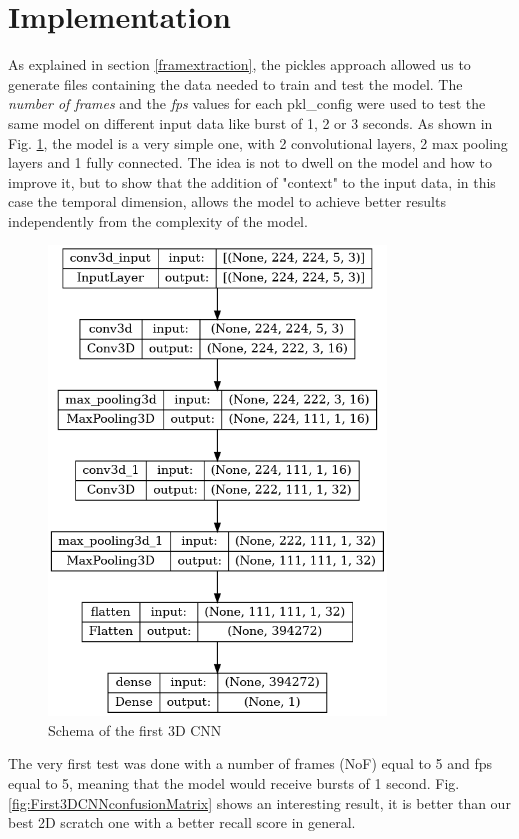 \section{Implementation}
As explained in section \ref{framextraction}, the pickles approach allowed us to generate files containing the data needed to train and test the model. The \textit{number of frames} and the \textit{fps} values for each pkl\_config were used to test the same model on different input data like burst of 1, 2 or 3 seconds. As shown in Fig. \ref{fig:3DCNNschema}, the model is a very simple one, with 2 convolutional layers, 2 max pooling layers and 1 fully connected. The idea is not to dwell on the model and how to improve it, but to show that the addition of "context" to the input data, in this case the temporal dimension, allows the model to achieve better results independently from the complexity of the model.
\begin{figure}[]
    \centering
    \includegraphics[width=0.8\textwidth, height=0.6\textwidth, keepaspectratio]{images/3D9CNNschema.png}
    \caption{Schema of the first 3D CNN}
    \label{fig:3DCNNschema}
\end{figure}

The very first test was done with a number of frames (NoF) equal to 5 and fps equal to 5, meaning that the model would receive bursts of 1 second. Fig. \ref{fig:First3DCNNconfusionMatrix} shows an interesting result, it is better than our best 2D scratch one with a better recall score in general.

